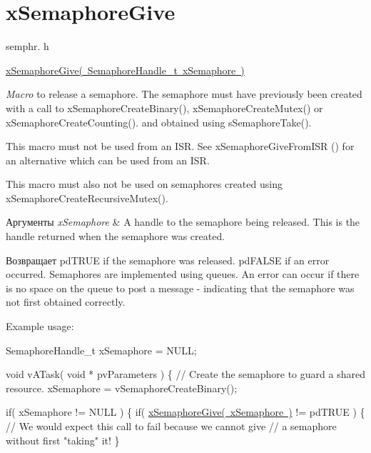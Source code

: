 \hypertarget{group__x_semaphore_give}{}\section{x\+Semaphore\+Give}
\label{group__x_semaphore_give}
semphr. h 
\begin{DoxyPre}\mbox{\hyperlink{semphr_8h_aae55761cabfa9bf85c8f4430f78c0953}{xSemaphoreGive( SemaphoreHandle\_t xSemaphore )}}\end{DoxyPre}


{\itshape Macro} to release a semaphore. The semaphore must have previously been created with a call to x\+Semaphore\+Create\+Binary(), x\+Semaphore\+Create\+Mutex() or x\+Semaphore\+Create\+Counting(). and obtained using s\+Semaphore\+Take().

This macro must not be used from an I\+SR. See x\+Semaphore\+Give\+From\+I\+SR () for an alternative which can be used from an I\+SR.

This macro must also not be used on semaphores created using x\+Semaphore\+Create\+Recursive\+Mutex().


\begin{DoxyParams}{Аргументы}
{\em x\+Semaphore} & A handle to the semaphore being released. This is the handle returned when the semaphore was created.\\
\hline
\end{DoxyParams}
\begin{DoxyReturn}{Возвращает}
pd\+T\+R\+UE if the semaphore was released. pd\+F\+A\+L\+SE if an error occurred. Semaphores are implemented using queues. An error can occur if there is no space on the queue to post a message -\/ indicating that the semaphore was not first obtained correctly.
\end{DoxyReturn}
Example usage\+: 
\begin{DoxyPre}
SemaphoreHandle\_t xSemaphore = NULL;\end{DoxyPre}



\begin{DoxyPre}void vATask( void * pvParameters )
\{
   // Create the semaphore to guard a shared resource.
   xSemaphore = vSemaphoreCreateBinary();\end{DoxyPre}



\begin{DoxyPre}   if( xSemaphore != NULL )
   \{
       if( \mbox{\hyperlink{semphr_8h_aae55761cabfa9bf85c8f4430f78c0953}{xSemaphoreGive( xSemaphore )}} != pdTRUE )
       \{
           // We would expect this call to fail because we cannot give
           // a semaphore without first "taking" it!
       \}\end{DoxyPre}



